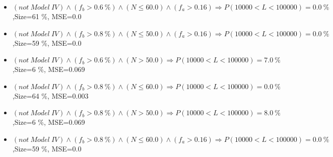 \documentclass[numbered]{CSL}
\begin{document}
\begin{itemize}
\item $(not~Model~IV) \land (f_b > 0.6~\%) \land (N \leq 60.0) \land (f_a > 0.16) \Rightarrow P(10 000 < L < 100 000) = 0.0~\%$,\hfill Size=61 \%, MSE=0.0
\item $(not~Model~IV) \land (f_b > 0.8~\%) \land (N \leq 50.0) \land (f_a > 0.16) \Rightarrow P(10 000 < L < 100 000) = 0.0~\%$,\hfill Size=59 \%, MSE=0.0
\item $(not~Model~IV) \land (f_b > 0.6~\%) \land (N > 50.0) \Rightarrow P(10 000 < L < 100 000) = 7.0~\%$,\hfill Size=6 \%, MSE=0.069
\item $(not~Model~IV) \land (f_b > 0.8~\%) \land (N \leq 60.0) \Rightarrow P(10 000 < L < 100 000) = 0.0~\%$,\hfill Size=64 \%, MSE=0.003
\item $(not~Model~IV) \land (f_b > 0.8~\%) \land (N > 50.0) \Rightarrow P(10 000 < L < 100 000) = 8.0~\%$,\hfill Size=6 \%, MSE=0.069
\item $(not~Model~IV) \land (f_b > 0.8~\%) \land (N \leq 60.0) \land (f_a > 0.16) \Rightarrow P(10 000 < L < 100 000) = 0.0~\%$,\hfill Size=59 \%, MSE=0.0
\end{itemize}
\end{document}
